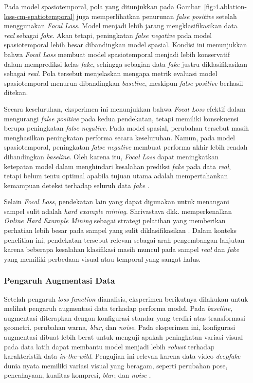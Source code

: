 Pada model spasiotemporal, pola yang ditunjukkan pada Gambar~\ref{fig:4.ablation-loss-cm-spatiotemporal} juga memperlihatkan penurunan \textit{false positive} setelah menggunakan \textit{Focal Loss}. Model menjadi lebih jarang mengklasifikasikan data \textit{real} sebagai \textit{fake}. Akan tetapi, peningkatan \textit{false negative} pada model spasiotemporal lebih besar dibandingkan model spasial. Kondisi ini menunjukkan bahwa \textit{Focal Loss} membuat model spasiotemporal menjadi lebih konservatif dalam memprediksi kelas \textit{fake}, sehingga sebagian data \textit{fake} justru diklasifikasikan sebagai \textit{real}. Pola tersebut menjelaskan mengapa metrik evaluasi model spasiotemporal menurun dibandingkan \textit{baseline}, meskipun \textit{false positive} berhasil ditekan.

Secara keseluruhan, eksperimen ini menunjukkan bahwa \textit{Focal Loss} efektif dalam mengurangi \textit{false positive} pada kedua pendekatan, tetapi memiliki konsekuensi berupa peningkatan \textit{false negative}. Pada model spasial, perubahan tersebut masih menghasilkan peningkatan performa secara keseluruhan. Namun, pada model spasiotemporal, peningkatan \textit{false negative} membuat performa akhir lebih rendah dibandingkan \textit{baseline}. Oleh karena itu, \textit{Focal Loss} dapat meningkatkan ketepatan model dalam menghindari kesalahan prediksi \textit{fake} pada data \textit{real}, tetapi belum tentu optimal apabila tujuan utama adalah mempertahankan kemampuan deteksi terhadap seluruh data \textit{fake} \cite{lin2018focallossdenseobject}.

Selain \textit{Focal Loss}, pendekatan lain yang dapat digunakan untuk menangani sampel sulit adalah \textit{hard example mining}. Shrivastava dkk. memperkenalkan \textit{Online Hard Example Mining} sebagai strategi pelatihan yang memberikan perhatian lebih besar pada sampel yang sulit diklasifikasikan \cite{shrivastava2016trainingregionbasedobjectdetectors}. Dalam konteks penelitian ini, pendekatan tersebut relevan sebagai arah pengembangan lanjutan karena beberapa kesalahan klasifikasi masih muncul pada sampel \textit{real} dan \textit{fake} yang memiliki perbedaan visual atau temporal yang sangat halus.

\subsubsection{Pengaruh Augmentasi Data} \label{IV.Eksperimen_Ablation_Augmentasi}
Setelah pengaruh \textit{loss function} dianalisis, eksperimen berikutnya dilakukan untuk melihat pengaruh augmentasi data terhadap performa model. Pada \textit{baseline}, augmentasi diterapkan dengan konfigurasi standar yang terdiri atas transformasi geometri, perubahan warna, \textit{blur}, dan \textit{noise}. Pada eksperimen ini, konfigurasi augmentasi dibuat lebih berat untuk menguji apakah peningkatan variasi visual pada data latih dapat membantu model menjadi lebih \textit{robust} terhadap karakteristik data \textit{in-the-wild}. Pengujian ini relevan karena data video \textit{deepfake} dunia nyata memiliki variasi visual yang beragam, seperti perubahan pose, pencahayaan, kualitas kompresi, \textit{blur}, dan \textit{noise} \cite{MUMUNI2022100258}.


